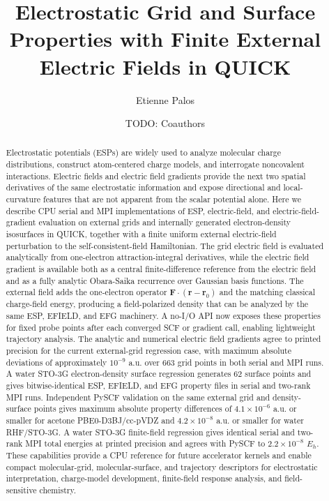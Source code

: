 \documentclass[journal=jcisd8,manuscript=article]{achemso}
\title{Electrostatic Grid and Surface Properties with Finite External Electric Fields in QUICK}
\author{Etienne Palos}
\affiliation{Department of Chemistry, Michigan State University, East Lansing, Michigan, United States}
\author{TODO: Coauthors}
\affiliation{TODO: Affiliations}
\begin{document}
\begin{abstract}
Electrostatic potentials (ESPs) are widely used to analyze molecular charge distributions, construct atom-centered charge models, and interrogate noncovalent interactions.  Electric fields and electric field gradients provide the next two spatial derivatives of the same electrostatic information and expose directional and local-curvature features that are not apparent from the scalar potential alone.  Here we describe CPU serial and MPI implementations of ESP, electric-field, and electric-field-gradient evaluation on external grids and internally generated electron-density isosurfaces in QUICK, together with a finite uniform external electric-field perturbation to the self-consistent-field Hamiltonian.  The grid electric field is evaluated analytically from one-electron attraction-integral derivatives, while the electric field gradient is available both as a central finite-difference reference from the electric field and as a fully analytic Obara-Saika recurrence over Gaussian basis functions.  The external field adds the one-electron operator \(\mathbf{F}\cdot(\mathbf{r}-\mathbf{r}_0)\) and the matching classical charge-field energy, producing a field-polarized density that can be analyzed by the same ESP, EFIELD, and EFG machinery.  A no-I/O API now exposes these properties for fixed probe points after each converged SCF or gradient call, enabling lightweight trajectory analysis.  The analytic and numerical electric field gradients agree to printed precision for the current external-grid regression case, with maximum absolute deviations of approximately \(10^{-9}\) a.u. over 663 grid points in both serial and MPI runs.  A water STO-3G electron-density surface regression generates 62 surface points and gives bitwise-identical ESP, EFIELD, and EFG property files in serial and two-rank MPI runs.  Independent PySCF validation on the same external grid and density-surface points gives maximum absolute property differences of \(4.1\times10^{-6}\) a.u. or smaller for acetone PBE0-D3BJ/cc-pVDZ and \(4.2\times10^{-8}\) a.u. or smaller for water RHF/STO-3G.  A water STO-3G finite-field regression gives identical serial and two-rank MPI total energies at printed precision and agrees with PySCF to \(2.2\times10^{-8}\) \(E_h\).  These capabilities provide a CPU reference for future accelerator kernels and enable compact molecular-grid, molecular-surface, and trajectory descriptors for electrostatic interpretation, charge-model development, finite-field response analysis, and field-sensitive chemistry.
\end{abstract}
\end{document}
